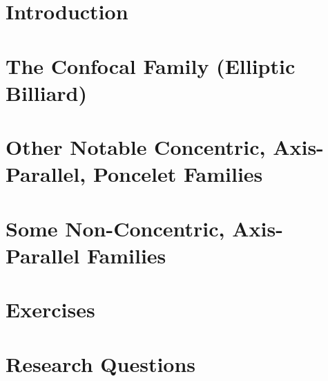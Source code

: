 \section{Introduction}
\label{sec:03-intro}


\section{The Confocal Family (Elliptic Billiard)}
\label{sec:03-billiard}


\section[More concentric Poncelet families]{Other Notable Concentric, Axis-Parallel, Poncelet Families}
\label{sec:03-other-conc}
 
 
\section{Some Non-Concentric, Axis-Parallel Families}
\label{sec:04-non-conc}
 

\section{Exercises}
\label{sec:03-exercises}


\section{Research Questions}
\label{sec:03-research}

